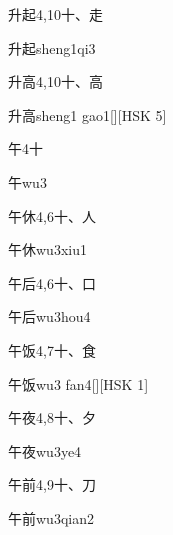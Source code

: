 \begin{Entry}{升起}{4,10}{⼗、⾛}
  \begin{Phonetics}{升起}{sheng1qi3}
  \end{Phonetics}
\end{Entry}

\begin{Entry}{升高}{4,10}{⼗、⾼}
  \begin{Phonetics}{升高}{sheng1 gao1}[][HSK 5]
  \end{Phonetics}
\end{Entry}

\begin{Entry}{午}{4}{⼗}
  \begin{Phonetics}{午}{wu3}
  \end{Phonetics}
\end{Entry}

\begin{Entry}{午休}{4,6}{⼗、⼈}
  \begin{Phonetics}{午休}{wu3xiu1}
  \end{Phonetics}
\end{Entry}

\begin{Entry}{午后}{4,6}{⼗、⼝}
  \begin{Phonetics}{午后}{wu3hou4}
  \end{Phonetics}
\end{Entry}

\begin{Entry}{午饭}{4,7}{⼗、⾷}
  \begin{Phonetics}{午饭}{wu3 fan4}[][HSK 1]
  \end{Phonetics}
\end{Entry}

\begin{Entry}{午夜}{4,8}{⼗、⼣}
  \begin{Phonetics}{午夜}{wu3ye4}
  \end{Phonetics}
\end{Entry}

\begin{Entry}{午前}{4,9}{⼗、⼑}
  \begin{Phonetics}{午前}{wu3qian2}
  \end{Phonetics}
\end{Entry}

